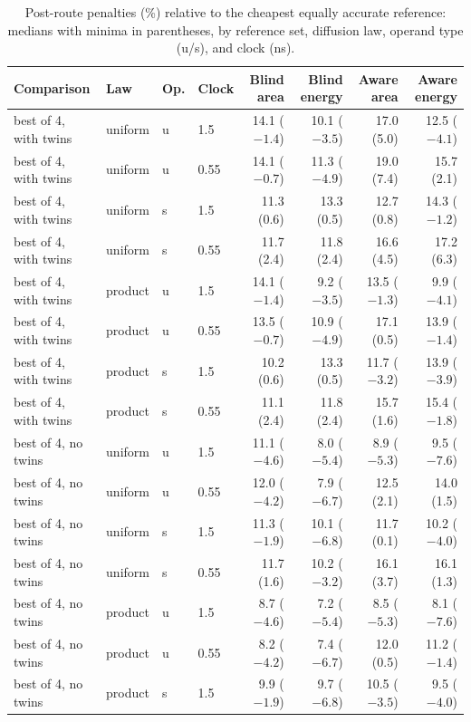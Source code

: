 \begin{table}[t]
\centering
\caption{Post-route penalties (\%) relative to the cheapest equally accurate reference: medians with minima in parentheses, by reference set, diffusion law, operand type (u/s), and clock (ns).}
\label{tab:pnrfull}
\scriptsize
\setlength{\tabcolsep}{2.5pt}
\begin{tabular}{llllrrrr}
\toprule
Comparison & Law & Op. & Clock & Blind area & Blind energy & Aware area & Aware energy\\
\midrule
best of 4, with twins & uniform & u & 1.5 & 14.1 ($-1.4$) & 10.1 ($-3.5$) & 17.0 (5.0) & 12.5 ($-4.1$)\\
best of 4, with twins & uniform & u & 0.55 & 14.1 ($-0.7$) & 11.3 ($-4.9$) & 19.0 (7.4) & 15.7 (2.1)\\
best of 4, with twins & uniform & s & 1.5 & 11.3 (0.6) & 13.3 (0.5) & 12.7 (0.8) & 14.3 ($-1.2$)\\
best of 4, with twins & uniform & s & 0.55 & 11.7 (2.4) & 11.8 (2.4) & 16.6 (4.5) & 17.2 (6.3)\\
best of 4, with twins & product & u & 1.5 & 14.1 ($-1.4$) & 9.2 ($-3.5$) & 13.5 ($-1.3$) & 9.9 ($-4.1$)\\
best of 4, with twins & product & u & 0.55 & 13.5 ($-0.7$) & 10.9 ($-4.9$) & 17.1 (0.5) & 13.9 ($-1.4$)\\
best of 4, with twins & product & s & 1.5 & 10.2 (0.6) & 13.3 (0.5) & 11.7 ($-3.2$) & 13.9 ($-3.9$)\\
best of 4, with twins & product & s & 0.55 & 11.1 (2.4) & 11.8 (2.4) & 15.7 (1.6) & 15.4 ($-1.8$)\\
best of 4, no twins & uniform & u & 1.5 & 11.1 ($-4.6$) & 8.0 ($-5.4$) & 8.9 ($-5.3$) & 9.5 ($-7.6$)\\
best of 4, no twins & uniform & u & 0.55 & 12.0 ($-4.2$) & 7.9 ($-6.7$) & 12.5 (2.1) & 14.0 (1.5)\\
best of 4, no twins & uniform & s & 1.5 & 11.3 ($-1.9$) & 10.1 ($-6.8$) & 11.7 (0.1) & 10.2 ($-4.0$)\\
best of 4, no twins & uniform & s & 0.55 & 11.7 (1.6) & 10.2 ($-3.2$) & 16.1 (3.7) & 16.1 (1.3)\\
best of 4, no twins & product & u & 1.5 & 8.7 ($-4.6$) & 7.2 ($-5.4$) & 8.5 ($-5.3$) & 8.1 ($-7.6$)\\
best of 4, no twins & product & u & 0.55 & 8.2 ($-4.2$) & 7.4 ($-6.7$) & 12.0 (0.5) & 11.2 ($-1.4$)\\
best of 4, no twins & product & s & 1.5 & 9.9 ($-1.9$) & 9.7 ($-6.8$) & 10.5 ($-3.5$) & 9.5 ($-4.0$)\\

\end{tabular}
\end{table}

